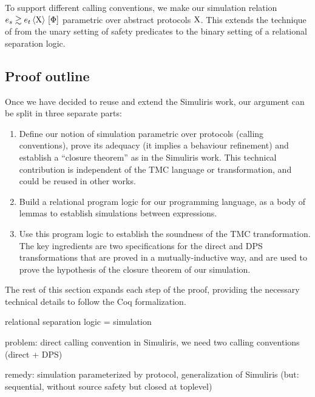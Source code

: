 To support different calling conventions, we make our simulation relation $\iSim[\iProt]{\iPred}{\datalangExpr_s}{\datalangExpr_t}$ parametric over abstract protocols $\mathrm{X}$. This extends the technique of \citet*{TODO-paulo} from the unary setting of safety predicates to the binary setting of a relational separation logic.

\subsection{Proof outline}

Once we have decided to reuse and extend the Simuliris work, our argument can be split in three separate parts:

\begin{enumerate}

\item Define our notion of simulation parametric over protocols (calling conventions), prove its adequacy (it implies a behaviour refinement) and establish a ``closure theorem'' as in the Simuliris work.
%
  This technical contribution is independent of the TMC language or transformation, and could be reused in other works.

\item Build a relational program logic for our programming language, as a body of lemmas to establish simulations between expressions.

\item Use this program logic to establish the soundness of the TMC transformation.
%
The key ingredients are two specifications for the direct and DPS transformations that are proved in a mutually-inductive way, and are used to prove the hypothesis of the closure theorem of our simulation.
\end{enumerate}

The rest of this section expands each step of the proof, providing the necessary technical details to follow the Coq formalization.

relational separation logic = simulation

problem: direct calling convention in Simuliris, we need two calling conventions (direct + DPS)

remedy: simulation parameterized by protocol, generalization of Simuliris (but: sequential, without source safety but closed at toplevel)



